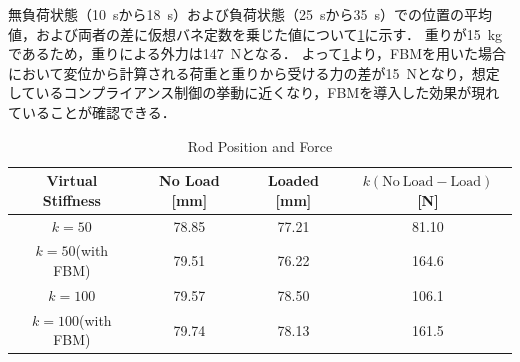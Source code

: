 無負荷状態（\SI{10}{s}から\SI{18}{s}）および負荷状態（\SI{25}{s}から\SI{35}{s}）での位置の平均値，および両者の差に仮想バネ定数を乗じた値について\tabname\ref{tab:position}に示す．
重りが\SI{15}{kg}であるため，重りによる外力は\SI{147}{N}となる．
よって\tabname\ref{tab:position}より，FBMを用いた場合において変位から計算される荷重と重りから受ける力の差が\SI{15}{N}となり，想定しているコンプライアンス制御の挙動に近くなり，FBMを導入した効果が現れていることが確認できる．

\begin{table}[t]
    \caption{Rod Position and Force}
    \label{tab:position}
    \centering
    \begin{tabular}{cccc}
    Virtual Stiffness&No Load [mm] &Loaded [mm] &$k(\mathrm{No~Load} - \mathrm{Load})$ [N]\\ \hline
        $k=50$&78.85&77.21&81.10\\
        $k=50$(with FBM)&79.51&76.22&164.6\\
        $k=100$&79.57&78.50&106.1\\
        $k=100$(with FBM)&79.74&78.13&161.5\\ \hline
    \end{tabular}
\end{table}
